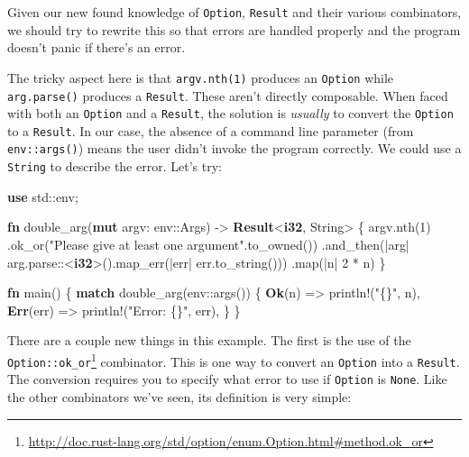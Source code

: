 \documentclass[a4paper,]{book}
\newenvironment{Shaded}{\begin{snugshade}}{\end{snugshade}}
\newcommand{\KeywordTok}[1]{\textcolor[rgb]{0.13,0.29,0.53}{\textbf{{#1}}}}
\newcommand{\DecValTok}[1]{\textcolor[rgb]{0.00,0.00,0.81}{{#1}}}
\newcommand{\StringTok}[1]{\textcolor[rgb]{0.31,0.60,0.02}{{#1}}}
\newcommand{\OtherTok}[1]{\textcolor[rgb]{0.56,0.35,0.01}{{#1}}}
\newcommand{\NormalTok}[1]{{#1}}
\renewcommand{\href}[2]{#2\footnote{\url{#1}}}
\begin{document}
Given our new found knowledge of \texttt{Option}, \texttt{Result} and
their various combinators, we should try to rewrite this so that errors
are handled properly and the program doesn't panic if there's an error.

The tricky aspect here is that \texttt{argv.nth(1)} produces an
\texttt{Option} while \texttt{arg.parse()} produces a \texttt{Result}.
These aren't directly composable. When faced with both an
\texttt{Option} and a \texttt{Result}, the solution is \emph{usually} to
convert the \texttt{Option} to a \texttt{Result}. In our case, the
absence of a command line parameter (from \texttt{env::args()}) means
the user didn't invoke the program correctly. We could use a
\texttt{String} to describe the error. Let's try:


\begin{Shaded}
\begin{Highlighting}[]
\KeywordTok{use} \NormalTok{std::env;}

\KeywordTok{fn} \NormalTok{double_arg(}\KeywordTok{mut} \NormalTok{argv: env::Args) -> }\KeywordTok{Result}\NormalTok{<}\KeywordTok{i32}\NormalTok{, String> \{}
    \NormalTok{argv.nth(}\DecValTok{1}\NormalTok{)}
        \NormalTok{.ok_or(}\StringTok{"Please give at least one argument"}\NormalTok{.to_owned())}
        \NormalTok{.and_then(|arg| arg.parse::<}\KeywordTok{i32}\NormalTok{>().map_err(|err| err.to_string()))}
        \NormalTok{.map(|n| }\DecValTok{2} \NormalTok{* n)}
\NormalTok{\}}

\KeywordTok{fn} \NormalTok{main() \{}
    \KeywordTok{match} \NormalTok{double_arg(env::args()) \{}
        \KeywordTok{Ok}\NormalTok{(n) => }\OtherTok{println!}\NormalTok{(}\StringTok{"\{\}"}\NormalTok{, n),}
        \KeywordTok{Err}\NormalTok{(err) => }\OtherTok{println!}\NormalTok{(}\StringTok{"Error: \{\}"}\NormalTok{, err),}
    \NormalTok{\}}
\NormalTok{\}}
\end{Highlighting}
\end{Shaded}

There are a couple new things in this example. The first is the use of
the
\href{http://doc.rust-lang.org/std/option/enum.Option.html\#method.ok_or}{\texttt{Option::ok\_or}}
combinator. This is one way to convert an \texttt{Option} into a
\texttt{Result}. The conversion requires you to specify what error to
use if \texttt{Option} is \texttt{None}. Like the other combinators
we've seen, its definition is very simple:
\end{document}
